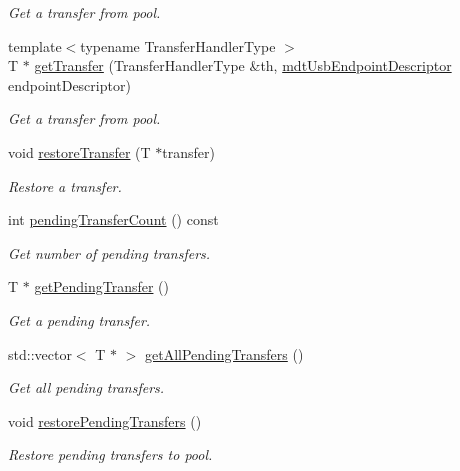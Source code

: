 \begin{DoxyCompactItemize}
\begin{DoxyCompactList}\small\item\em Get a transfer from pool. \end{DoxyCompactList}\item 
{\footnotesize template$<$typename Transfer\-Handler\-Type $>$ }\\T $\ast$ \hyperlink{classmdt_usb_transfer_pool_ab9355c98dc6bb300bddf4a9efc2b2828}{get\-Transfer} (Transfer\-Handler\-Type \&th, \hyperlink{classmdt_usb_endpoint_descriptor}{mdt\-Usb\-Endpoint\-Descriptor} endpoint\-Descriptor)
\begin{DoxyCompactList}\small\item\em Get a transfer from pool. \end{DoxyCompactList}\item 
void \hyperlink{classmdt_usb_transfer_pool_afc3e25bd7fee70de2aaf819e0dc8e2d1}{restore\-Transfer} (T $\ast$transfer)
\begin{DoxyCompactList}\small\item\em Restore a transfer. \end{DoxyCompactList}\item 
int \hyperlink{classmdt_usb_transfer_pool_ac1291ff9db5a6a49e8e32e792e7df6c5}{pending\-Transfer\-Count} () const 
\begin{DoxyCompactList}\small\item\em Get number of pending transfers. \end{DoxyCompactList}\item 
T $\ast$ \hyperlink{classmdt_usb_transfer_pool_a5cdb802491240b96ce3211f7c202df47}{get\-Pending\-Transfer} ()
\begin{DoxyCompactList}\small\item\em Get a pending transfer. \end{DoxyCompactList}\item 
std\-::vector$<$ T $\ast$ $>$ \hyperlink{classmdt_usb_transfer_pool_a282361af51e1fcaebfe8de1107a44ccb}{get\-All\-Pending\-Transfers} ()
\begin{DoxyCompactList}\small\item\em Get all pending transfers. \end{DoxyCompactList}\item 
void \hyperlink{classmdt_usb_transfer_pool_a51f345ee3b9fcbc65f4638d12e001c39}{restore\-Pending\-Transfers} ()
\begin{DoxyCompactList}\small\item\em Restore pending transfers to pool. \end{DoxyCompactList}\end{DoxyCompactItemize}


